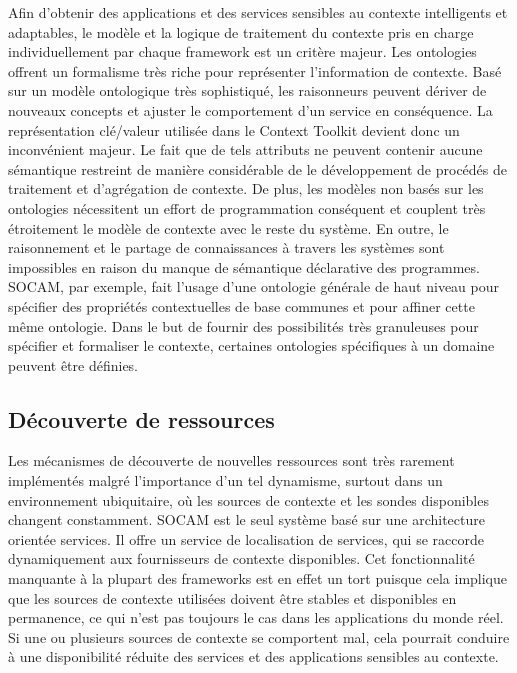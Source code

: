 Afin d'obtenir des applications et des services sensibles au contexte
intelligents et adaptables, le modèle et la logique de traitement du contexte
pris en charge individuellement par chaque framework est un critère majeur. Les
ontologies offrent un formalisme très riche pour représenter l'information de
contexte.  Basé sur un modèle ontologique très sophistiqué, les raisonneurs
peuvent dériver de nouveaux concepts et ajuster le comportement d'un service en
conséquence. La représentation clé/valeur utilisée dans le Context Toolkit
devient donc un inconvénient majeur. Le fait que de tels attributs ne peuvent
contenir aucune sémantique restreint de manière considérable de le développement
de procédés de traitement et d'agrégation de contexte. De plus, les modèles non
basés sur les ontologies nécessitent un effort de programmation conséquent et
couplent très étroitement le modèle de contexte avec le reste du système. En
outre, le raisonnement et le partage de connaissances à travers les systèmes
sont impossibles en raison du manque de sémantique déclarative des programmes.
SOCAM, par exemple, fait l'usage d'une ontologie générale de haut niveau pour
spécifier des propriétés contextuelles de base communes et pour affiner cette
même ontologie. Dans le but de fournir des possibilités très granuleuses pour
spécifier et formaliser le contexte, certaines ontologies spécifiques à un
domaine peuvent être définies.

\subsection{Découverte de ressources}

Les mécanismes de découverte de nouvelles ressources sont très rarement
implémentés malgré l'importance d'un tel dynamisme, surtout dans un environnement
ubiquitaire, où les sources de contexte et les sondes disponibles changent
constamment. SOCAM est le seul système basé sur une architecture orientée
services. Il offre un service de localisation de services, qui se raccorde
dynamiquement aux fournisseurs de contexte disponibles. Cet fonctionnalité
manquante à la plupart des frameworks est en effet un tort puisque cela implique
que les sources de contexte utilisées doivent être stables et disponibles en
permanence, ce qui n'est pas toujours le cas dans les applications du monde
réel. Si une ou plusieurs sources de contexte se comportent mal, cela pourrait
conduire à une disponibilité réduite des services et des applications sensibles
au contexte.

